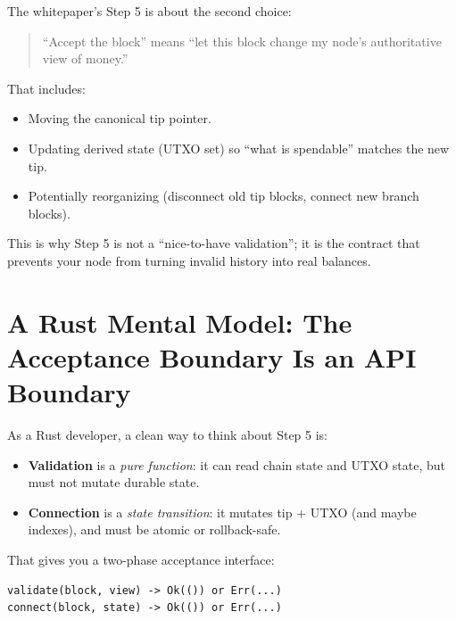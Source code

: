 The whitepaper's Step 5 is about the second choice:

\begin{quote}
``Accept the block'' means ``let this block change my node's authoritative view of money.''
\end{quote}

That includes:

\begin{itemize}
  \item Moving the canonical tip pointer.
  \item Updating derived state (UTXO set) so ``what is spendable'' matches the new tip.
  \item Potentially reorganizing (disconnect old tip blocks, connect new branch blocks).
\end{itemize}

This is why Step 5 is not a ``nice-to-have validation''; it is the contract that prevents your node from turning invalid history into real balances.

\section{A Rust Mental Model: The Acceptance Boundary Is an API Boundary}
\label{sec:ch10-mental-model}

As a Rust developer, a clean way to think about Step 5 is:

\begin{itemize}
  \item \textbf{Validation} is a \emph{pure function}: it can read chain state and UTXO state, but must not mutate durable state.
  \item \textbf{Connection} is a \emph{state transition}: it mutates tip + UTXO (and maybe indexes), and must be atomic or rollback-safe.
\end{itemize}

That gives you a two-phase acceptance interface:

\begin{verbatim}
validate(block, view) -> Ok(()) or Err(...)
connect(block, state) -> Ok(()) or Err(...)
\end{verbatim}

